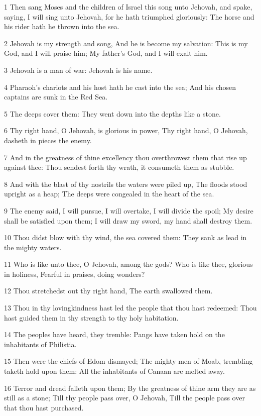 \par 1 Then sang Moses and the children of Israel this song unto Jehovah, and spake, saying, I will sing unto Jehovah, for he hath triumphed gloriously: The horse and his rider hath he thrown into the sea.
\par 2 Jehovah is my strength and song, And he is become my salvation: This is my God, and I will praise him; My father's God, and I will exalt him.
\par 3 Jehovah is a man of war: Jehovah is his name.
\par 4 Pharaoh's chariots and his host hath he cast into the sea; And his chosen captains are sunk in the Red Sea.
\par 5 The deeps cover them: They went down into the depths like a stone.
\par 6 Thy right hand, O Jehovah, is glorious in power, Thy right hand, O Jehovah, dasheth in pieces the enemy.
\par 7 And in the greatness of thine excellency thou overthrowest them that rise up against thee: Thou sendest forth thy wrath, it consumeth them as stubble.
\par 8 And with the blast of thy nostrils the waters were piled up, The floods stood upright as a heap; The deeps were congealed in the heart of the sea.
\par 9 The enemy said, I will pursue, I will overtake, I will divide the spoil; My desire shall be satisfied upon them; I will draw my sword, my hand shall destroy them.
\par 10 Thou didst blow with thy wind, the sea covered them: They sank as lead in the mighty waters.
\par 11 Who is like unto thee, O Jehovah, among the gods? Who is like thee, glorious in holiness, Fearful in praises, doing wonders?
\par 12 Thou stretchedst out thy right hand, The earth swallowed them.
\par 13 Thou in thy lovingkindness hast led the people that thou hast redeemed: Thou hast guided them in thy strength to thy holy habitation.
\par 14 The peoples have heard, they tremble: Pangs have taken hold on the inhabitants of Philistia.
\par 15 Then were the chiefs of Edom dismayed; The mighty men of Moab, trembling taketh hold upon them: All the inhabitants of Canaan are melted away.
\par 16 Terror and dread falleth upon them; By the greatness of thine arm they are as still as a stone; Till thy people pass over, O Jehovah, Till the people pass over that thou hast purchased.
